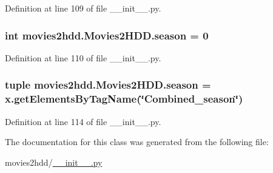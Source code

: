 Definition at line 109 of file \-\_\-\-\_\-init\-\_\-\-\_\-.\-py.

\hypertarget{classmovies2hdd_1_1_movies2_h_d_d_a948397c62c191d15a109f9867b1a83ec}{
\subsubsection[{season}]{\setlength{\rightskip}{0pt plus 5cm}int movies2hdd.\-Movies2\-H\-D\-D.\-season = 0\hspace{0.3cm}{\ttfamily [static]}}}\label{classmovies2hdd_1_1_movies2_h_d_d_a948397c62c191d15a109f9867b1a83ec}


Definition at line 110 of file \-\_\-\-\_\-init\-\_\-\-\_\-.\-py.

\hypertarget{classmovies2hdd_1_1_movies2_h_d_d_a60b03ffa3e3f0b0afbaea6b3a3351dc1}{
\subsubsection[{season}]{\setlength{\rightskip}{0pt plus 5cm}tuple movies2hdd.\-Movies2\-H\-D\-D.\-season = x.\-get\-Elements\-By\-Tag\-Name(\char`\"{}Combined\-\_\-season\char`\"{})\hspace{0.3cm}{\ttfamily [static]}}}\label{classmovies2hdd_1_1_movies2_h_d_d_a60b03ffa3e3f0b0afbaea6b3a3351dc1}


Definition at line 114 of file \-\_\-\-\_\-init\-\_\-\-\_\-.\-py.



The documentation for this class was generated from the following file\-:\begin{DoxyCompactItemize}
\item 
movies2hdd/\hyperlink{____init_____8py}{\-\_\-\-\_\-init\-\_\-\-\_\-.\-py}\end{DoxyCompactItemize}

